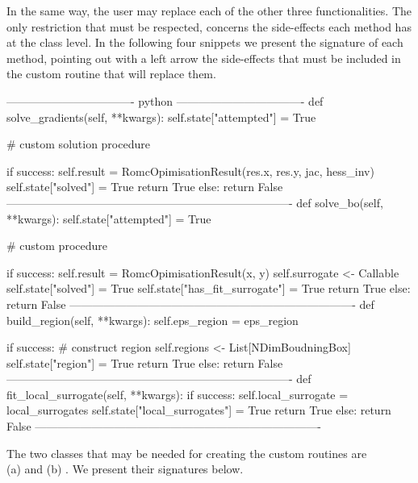 In the same way, the user may replace each of the other three
functionalities. The only restriction that must be respected, concerns
the side-effects each method has at the 
class level. In the following four snippets we present the signature
of each method, pointing out with a left arrow the side-effects that
must be included in the custom routine that will replace them.


\begin{Code}
---------------------------------- python ----------------------------------
def solve_gradients(self, **kwargs):
  self.state["attempted"] = True

  # custom solution procedure
  
  if success:
    self.result = RomcOpimisationResult(res.x, res.y, jac, hess_inv)
    self.state["solved"] = True
    return True 
  else:
    return False 
----------------------------------------------------------------------------    
def solve_bo(self, **kwargs):
  self.state["attempted"] = True

  # custom procedure

  if success:
    self.result = RomcOpimisationResult(x, y)
    self.surrogate <- Callable
    self.state["solved"] = True
    self.state["has_fit_surrogate"] = True
    return True
  else:
    return False
----------------------------------------------------------------------------    
def build_region(self, **kwargs):
    self.eps_region = eps_region

    if success:
        # construct region
        self.regions <- List[NDimBoudningBox]
        self.state["region"] = True
        return True
    else:
        return False
----------------------------------------------------------------------------    
def fit_local_surrogate(self, **kwargs):
  if success:
    self.local_surrogate = local_surrogates
    self.state["local_surrogates"] = True
    return True
  else:
    return False
----------------------------------------------------------------------------    
\end{Code}

The two classes that may be needed for creating the custom routines
are \\ (a)  and (b)
. We present their signatures below.

